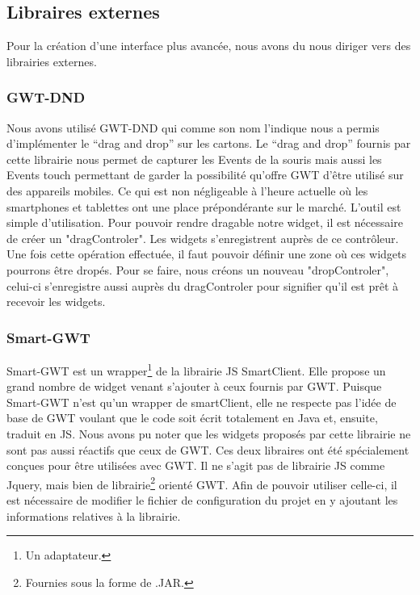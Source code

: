 \subsection{Libraires externes}
Pour la création d'une interface plus avancée, nous avons du nous diriger vers des librairies externes. 
\subsubsection{GWT-DND}
Nous avons utilisé GWT-DND qui comme son nom l'indique nous a permis
d'implémenter le \enquote{drag and drop} sur les cartons. Le \enquote{drag and drop} fournis par
cette librairie nous permet de capturer les Events de la souris mais aussi les Events touch permettant de garder la possibilité qu'offre GWT d'être utilisé sur des appareils mobiles. Ce qui est non négligeable à l'heure actuelle où les smartphones et tablettes ont une place prépondérante sur le marché. 
\newline
\indent
L'outil est simple d'utilisation. Pour pouvoir rendre dragable notre widget, il est nécessaire de créer un "dragControler". Les widgets s'enregistrent auprès de ce contrôleur. Une fois cette opération effectuée, il faut pouvoir définir une zone où ces widgets pourrons être dropés. Pour se faire, nous créons un nouveau "dropControler", celui-ci s'enregistre aussi auprès du dragControler pour signifier qu'il est prêt à recevoir les widgets.

\subsubsection{Smart-GWT}
Smart-GWT est un wrapper\footnote{Un adaptateur.} de la librairie JS SmartClient. Elle propose un grand nombre de widget venant s'ajouter à ceux fournis par GWT. Puisque Smart-GWT n'est qu'un wrapper de smartClient, elle ne respecte pas l'idée de base de GWT voulant que le code soit écrit totalement en Java et, ensuite, traduit en JS. Nous avons pu noter que les widgets proposés par cette librairie ne sont pas aussi réactifs que ceux de GWT.
\newline
\indent
Ces deux libraires ont été spécialement conçues pour être utilisées avec GWT. Il ne s'agit pas de librairie JS comme Jquery, mais bien de librairie\footnote{Fournies sous la forme de .JAR.} orienté GWT. Afin de pouvoir utiliser celle-ci, il est nécessaire de modifier le fichier de configuration du projet en y ajoutant les informations relatives à la librairie.


